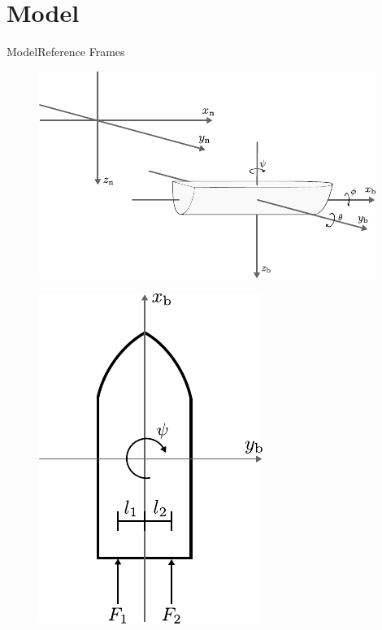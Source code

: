 \section{Model}

\begin{frame}{Model}{Reference Frames}
    \begin{minipage}{0.65\linewidth}
        \begin{figure}[H]
            \centering
            \includegraphics[width=1\linewidth]{figures/boat3D}
        \end{figure}        
    \end{minipage}\hfill      
    \begin{minipage}{0.3\linewidth}
        \begin{figure}[H]
            \centering
            \includegraphics[width=0.7\linewidth]{figures/boat2D}

\end{figure}
\end{minipage}
\end{frame}
